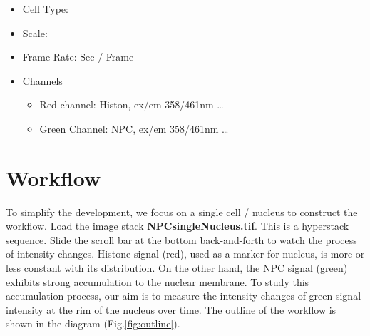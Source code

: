 \begin{itemize}
\item Cell Type: 
\item Scale: 
\item Frame Rate: Sec / Frame
\item Channels
\begin{itemize}
    \item Red channel: Histon, ex/em 358/461nm \dots
	\item Green Channel: NPC,  ex/em 358/461nm \dots
\end{itemize}
\end{itemize}

\section{Workflow}





To simplify the development, we focus on a single cell / nucleus to construct the workflow. Load the image stack \textbf{NPCsingleNucleus.tif}. This is a hyperstack sequence. Slide the scroll bar at the bottom back-and-forth to watch the process of intensity changes. Histone signal (red), used as a marker for nucleus, is more or less constant with its distribution. On the other hand, the NPC signal (green) exhibits strong accumulation to the nuclear membrane. To study this accumulation process, our aim is to measure the intensity changes of green signal intensity at the rim of the nucleus over time. The outline of the workflow is shown in the diagram (Fig.\ref{fig:outline}). 

